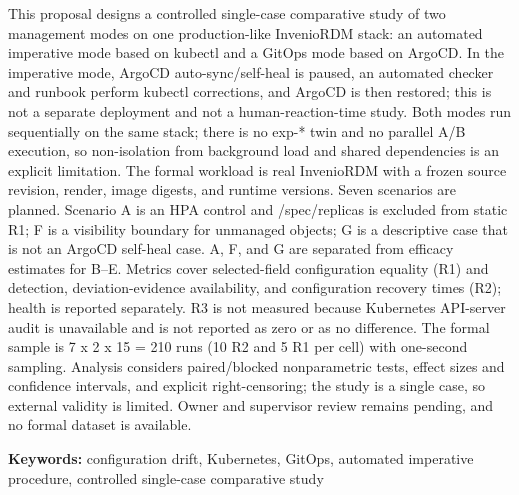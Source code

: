 \documentclass[proposal,indonesia]{ugmskripsi}
\begin{document}
\abstracteng
This proposal designs a controlled single-case comparative study of two management modes on one production-like InvenioRDM stack: an automated imperative mode based on kubectl and a GitOps mode based on ArgoCD. In the imperative mode, ArgoCD auto-sync/self-heal is paused, an automated checker and runbook perform kubectl corrections, and ArgoCD is then restored; this is not a separate deployment and not a human-reaction-time study. Both modes run sequentially on the same stack; there is no exp-* twin and no parallel A/B execution, so non-isolation from background load and shared dependencies is an explicit limitation. The formal workload is real InvenioRDM with a frozen source revision, render, image digests, and runtime versions. Seven scenarios are planned. Scenario A is an HPA control and /spec/replicas is excluded from static R1; F is a visibility boundary for unmanaged objects; G is a descriptive case that is not an ArgoCD self-heal case. A, F, and G are separated from efficacy estimates for B--E. Metrics cover selected-field configuration equality (R1) and detection, deviation-evidence availability, and configuration recovery times (R2); health is reported separately. R3 is not measured because Kubernetes API-server audit is unavailable and is not reported as zero or as no difference. The formal sample is 7 x 2 x 15 = 210 runs (10 R2 and 5 R1 per cell) with one-second sampling. Analysis considers paired/blocked nonparametric tests, effect sizes and confidence intervals, and explicit right-censoring; the study is a single case, so external validity is limited. Owner and supervisor review remains pending, and no formal dataset is available.

\vspace{0.5cm}
\noindent\textbf{Keywords:} configuration drift, Kubernetes, GitOps, automated imperative procedure, controlled single-case comparative study
\endabstracteng







\end{document}
